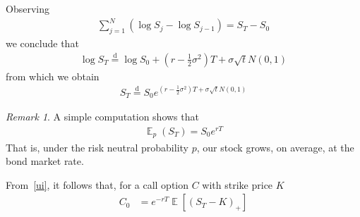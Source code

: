 \documentclass[12pt]{article}
\DeclareMathOperator{\ex}{\mathbb{E}}
\theoremstyle{plain}
\theoremstyle{definition}
\theoremstyle{remark}
\newtheorem*{remark}{Remark}
\numberwithin{equation}{section}  %
\begin{document}
Observing 
\begin{equation*}
\begin{split}
	\sum_{j=1}^{N} \left( \log S_{j} - \log S_{j-1} \right) = S_{T} - S_{0}
\end{split}
\end{equation*}
we conclude that
\begin{equation*}
\begin{split}
	\log S_{T} \overset{\text{d}}{=} 
	\log S_{0}  + \left( r - \frac{1}{2} \sigma^{2} \right)T
	+ \sigma \sqrt{t} N(0,1)
\end{split}
\end{equation*}
from which we obtain
\begin{equation*}
\begin{split}
	S_{T} \overset{\text{d}}{=} 
	S_{0} e^{\left( r - \frac{1}{2} \sigma^{2} \right)T + \sigma
	\sqrt{t}N(0,1)}
\end{split}
\end{equation*}
\begin{framed}
\begin{remark}
A simple computation shows that
\begin{equation*}
\begin{split}
	\ex_{p}(S_{T}) = S_{0}e^{rT}
\end{split}
\end{equation*}
That is, under the risk neutral probability $p$, our stock grows, on average,
at the bond market rate.
\end{remark}
\end{framed}
From~\eqref{ui}, it follows that, for a call option $C$ with strike
price $K$
\begin{equation*}
\begin{split}
	C_{0} & =  e^{-rT} \ex \left [{\left( S_{T} - K \right)}_{+} \right ]
\end{split}
\end{equation*}



\end{document}
